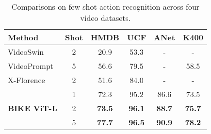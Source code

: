 \documentclass[10pt,twocolumn,letterpaper]{article}
\begin{document}
\begin{table*}[t]
\begin{minipage}[t]{0.41\linewidth}
{\begin{tabular}{lccccc}
      \textbf{Method}   & \textbf{Shot} & \textbf{HMDB} & \textbf{UCF} & \textbf{ANet} & \textbf{K400} \\ \midrule
       VideoSwin~\cite{videoswin} & 2 & 20.9  & 53.3  & - & - \\
       VideoPrompt~\cite{ju2022prompting}  & 5  & 56.6  & 79.5  & - & 58.5 \\
       X-Florence~\cite{x-clip}  & 2  & 51.6  & 84.0  & - & - \\ \midrule
       \multirow{3}{*}{\textbf{BIKE ViT-L}}
& 1  & 72.3  & 95.2  & 86.6 & 73.5 \\
        & 2  & \textbf{73.5}  & \textbf{96.1}  &  \textbf{88.7} & \textbf{75.7} \\
        & 5  & \textbf{77.7}  & \textbf{96.5}  &  \textbf{90.9} & \textbf{78.2} \\
        \bottomrule
    \end{tabular} }   
    \caption{Comparisons on few-shot action recognition across four video datasets.}
    \label{table:video_few}
    \end{minipage}
\end{table*}
 

\begin{table*}[t]
    \centering
 \caption{Comparisons on zero-shot video recognition.  denotes randomly selecting half of the test dataset's classes for evaluation, repeating the process ten times, and reporting the mean accuracy with standard deviation. For Kinetics-600, we adopt official code~\cite{ER} to select the 220 new categories outside of Kinetics-400 for evaluation.}
    \label{tab:sota_zero}        
\end{table*}
\end{document}
